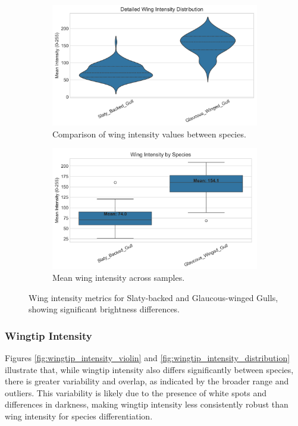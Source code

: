 \documentclass[a4paper,12pt]{report}
\begin{document}
\begin{figure}[H]
    \centering
    \begin{subfigure}[b]{0.44\textwidth}
        \centering
        \includegraphics[width=\textwidth]{images/REPORT_IMAGES_INTENSITY/I2/wing_intensity_analysis.png}
        \caption{Comparison of wing intensity values between species.}
        \label{fig:wing_intensity}
    \end{subfigure}
    \hfill
    \begin{subfigure}[b]{0.44\textwidth}
        \centering
        \includegraphics[width=\textwidth]{images/REPORT_IMAGES_INTENSITY/I2/WINGINTENSITY.png}
        \caption{Mean wing intensity across samples.}
        \label{fig:wing_intensity_means}
    \end{subfigure}
    \caption{Wing intensity metrics for Slaty-backed and Glaucous-winged Gulls, showing significant brightness differences.}
    \label{fig:wing_intensity_combined}
\end{figure}

\subsubsection{Wingtip Intensity}
Figures \ref{fig:wingtip_intensity_violin} and \ref{fig:wingtip_intensity_distribution} illustrate that, while wingtip intensity also differs significantly between species, there is greater variability and overlap, as indicated by the broader range and outliers. This variability is likely due to the presence of white spots and differences in darkness, making wingtip intensity less consistently robust than wing intensity for species differentiation.
\end{document}
